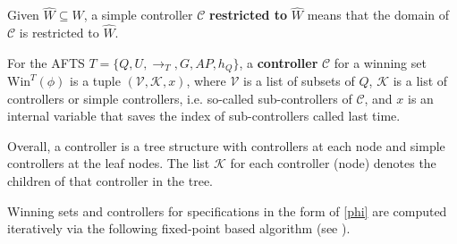 Given $\widehat{W} \subseteq W $, a simple controller $ \mathcal{C} $ \textbf{restricted to} $ \widehat{W} $ means that the domain of $ \mathcal{C} $ is restricted to $\widehat{W}$.

\begin{definition}
	For the AFTS $ T=\{Q,U,\rightarrow_T,G,AP,h_Q\} $, a \textbf{controller} $ \mathcal{C} $ for a winning set $ \text{Win}^T(\phi) $ is a tuple $ (\mathcal{V},\mathcal{K},x) $, where $ \mathcal{V} $ is a list of subsets of $ Q $, $ \mathcal{K} $ is a list of controllers or simple controllers, i.e. so-called sub-controllers of $ \mathcal{C} $, and $ x $ is an internal variable that saves the index of sub-controllers called last time.
	\label{def:cont}
\end{definition}
 
 Overall, a controller is a tree structure with controllers at each node and simple controllers at the leaf nodes. The list $\mathcal{K}$ for each controller (node) denotes the children of that controller in the tree.



{\color{purple} Winning sets and controllers} for specifications in the form of \eqref{phi} are computed iteratively via the following fixed-point based algorithm {\color{purple} (see \cite{Nilsson2017})}.


